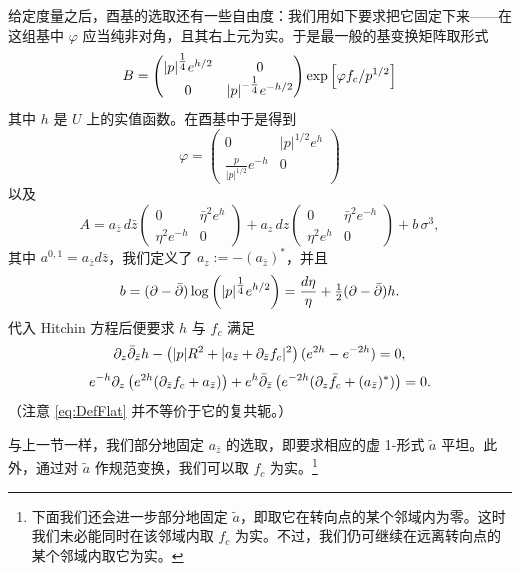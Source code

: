 给定度量之后，酉基的选取还有一些自由度：我们用如下要求把它固定下来——在这组基中 $\varphi$ 应当纯非对角，且其右上元为实。于是最一般的基变换矩阵取形式
\begin{equation} \label{eq:M}
B = \begin{pmatrix} |p|^{{\textstyle\frac{1}{4}}} e^{h/2} & 0 \\ 0 & |p|^{-{\textstyle\frac{1}{4}}} e^{-h/2} \end{pmatrix} \exp\left[\varphi f_c/p^{1/2}\right]
\end{equation}
其中 $h$ 是 $U$ 上的实值函数。在酉基中于是得到
\begin{equation}\label{eq:RealSect}
\varphi = \begin{pmatrix} 0 & |p|^{1/2} e^h \\ \frac{p}{|p|^{1/2}} e^{-h} & 0 \end{pmatrix}
\end{equation}
以及
\begin{equation}\label{eq:SpecGaugeField}
A = a_{\bar z}\,d\bar z\begin{pmatrix} 0 & \bar\eta^2 e^h \\ \eta^2 e^{-h} & 0 \end{pmatrix} + a_z\,dz\begin{pmatrix} 0 & \bar\eta^2 e^{-h} \\ \eta^2 e^{h} & 0 \end{pmatrix} + b\,\sigma^3,
\end{equation}
其中 $a^{0,1}=a_{\bar z}d\bar z$，我们定义了 $a_z:=-(a_{\bar z})^*$，并且
\begin{equation}\label{eq:bee}
b = (\partial-\bar\partial)\log\left(|p|^{{\textstyle\frac{1}{4}}} e^{h/2}\right) = \frac{d\eta}{\eta} + \tfrac{1}{2}(\partial-\bar\partial)h.
\end{equation}
代入 Hitchin 方程后便要求 $h$ 与 $f_c$ 满足
\begin{equation}\label{eq:DeformedpSG}
\partial_z\bar\partial_{\bar z}h - \left(|p|R^2 + |a_{\bar z} + \partial_{\bar z}f_c|^2\right)(e^{2h}-e^{-2h}) = 0,
\end{equation}
\begin{equation}\label{eq:DefFlat}
e^{-h}\partial_z\left(e^{2h}(\partial_{\bar z}f_c + a_{\bar z})\right) + e^{h}\bar\partial_{\bar z}\left(e^{-2h}(\partial_z\bar f_c + (a_{\bar z})^*)\right) = 0.
\end{equation}
（注意 \eqref{eq:DefFlat} 并不等价于它的复共轭。）

与上一节一样，我们部分地固定 $a_{\bar z}$ 的选取，即要求相应的虚 1-形式 $\tilde a$ 平坦。此外，通过对 $\tilde a$ 作规范变换，我们可以取 $f_c$ 为实。\footnote{下面我们还会进一步部分地固定 $\tilde a$，即取它在转向点的某个邻域内为零。这时我们未必能同时在该邻域内取 $f_c$ 为实。不过，我们仍可继续在远离转向点的某个邻域内取它为实。}

